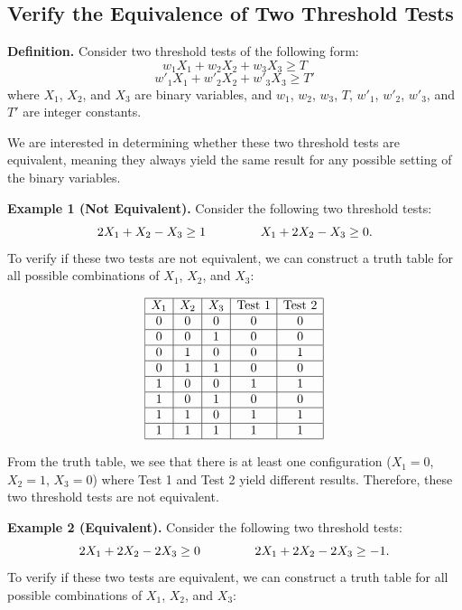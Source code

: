 \documentclass[]{article}
\begin{document}
\newpage
\subsection*{Verify the Equivalence of Two Threshold Tests}

\textbf{Definition.} Consider two threshold tests of the following form:
\[
w_1 X_1 + w_2 X_2 + w_3 X_3 \ge T
\]
\[
w'_1 X_1 + w'_2 X_2 + w'_3 X_3 \ge T'
\]
where \(X_1\), \(X_2\), and \(X_3\) are binary variables, and \(w_1\), \(w_2\), \(w_3\), \(T\), \(w'_1\), \(w'_2\), \(w'_3\), and \(T'\) are integer constants.

We are interested in determining whether these two threshold tests are equivalent, meaning they always yield the same result for any possible setting of the binary variables.

\textbf{Example 1 (Not Equivalent).} Consider the following two threshold tests:
\[
2 X_1 + X_2 - X_3 \ge 1
\mbox{ \quad\quad\quad\quad }
X_1 + 2X_2 - X_3 \ge 0.
\]
To verify if these two tests are not equivalent, we can construct a truth table for all possible combinations of \(X_1\), \(X_2\), and \(X_3\):

\[
\begin{array}{|c|c|c|c|c|}
\hline
X_1 & X_2 & X_3 & \text{Test 1} & \text{Test 2} \\
\hline
0 & 0 & 0 & 0 & 0 \\ \hline
0 & 0 & 1 & 0 & 0 \\ \hline
0 & 1 & 0 & 0 & 1 \\ \hline
0 & 1 & 1 & 0 & 0 \\ \hline
1 & 0 & 0 & 1 & 1 \\ \hline
1 & 0 & 1 & 0 & 0 \\ \hline
1 & 1 & 0 & 1 & 1 \\ \hline
1 & 1 & 1 & 1 & 1 \\ 
\hline 
\end{array}
\]

From the truth table, we see that there is at least one configuration (\(X_1 = 0\), \(X_2 = 1\), \(X_3 = 0\)) where Test 1 and Test 2 yield different results. Therefore, these two threshold tests are not equivalent.

\textbf{Example 2 (Equivalent).} Consider the following two threshold tests:
\[
2 X_1 + 2 X_2 - 2 X_3 \ge 0
\mbox{ \quad\quad\quad\quad }
2 X_1 + 2 X_2 - 2 X_3 \ge -1.
\]
To verify if these two tests are equivalent, we can construct a truth table for all possible combinations of \(X_1\), \(X_2\), and \(X_3\):
\end{document}

